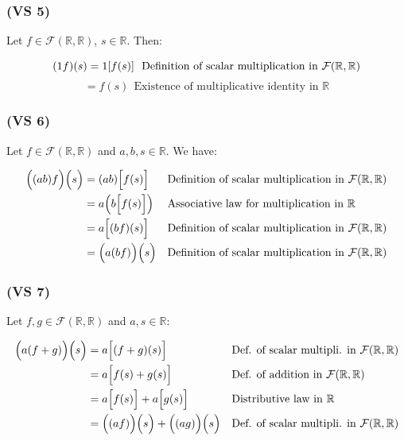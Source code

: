 \documentclass{article}
\begin{document}
\subsubsection*{(VS 5)}

Let \(f\in \mathcal{F}(\mathbb{R}, \mathbb{R})\), \( s \in \mathbb{R}\). Then:

\begin{equation*}
    (1f)(s) = 1[f(s)] \ \ \text{\text{Definition of scalar multiplication in \(\mathcal{F}(\mathbb{R}, \mathbb{R})\)}}
\end{equation*}
\begin{equation*}
    = f(s) \ \ \text{Existence of multiplicative identity in \(\mathbb{R}\)}
\end{equation*}

\subsubsection*{(VS 6)}

Let \(f\in \mathcal{F}(\mathbb{R}, \mathbb{R})\) and \( a, b, s \in \mathbb{R}\). We have:

\begin{align*}
    \Big((ab)f\Big)\Big(s\Big) &= (ab)\Big[f(s)\Big] && \text{\text{Definition of scalar multiplication in \(\mathcal{F}(\mathbb{R}, \mathbb{R})\)}}\\
    &= a\Big(b\Big[f(s)\Big]\Big) && \text{Associative law for multiplication in \(\mathbb{R}\)} \\
    &= a\Big[(bf)(s)\Big] && \text{\text{Definition of scalar multiplication in \(\mathcal{F}(\mathbb{R}, \mathbb{R})\)}} \\
    &= \Big(a(bf)\Big)\Big(s\Big) &&  \text{\text{Definition of scalar multiplication in \(\mathcal{F}(\mathbb{R}, \mathbb{R})\)}} 
\end{align*}

\subsubsection*{(VS 7)}

Let \(f, g \in \mathcal{F}(\mathbb{R}, \mathbb{R})\) and \( a, s \in \mathbb{R}\):

\begin{align*}
    \Big(a(f+g)\Big)\Big(s\Big) &= a\Big[(f+g)(s)\Big] && \text{\text{Def. of scalar multipli. in \(\mathcal{F}(\mathbb{R}, \mathbb{R})\)}}\\
    &= a\Big[f(s) + g(s)\Big]  && \text{Def. of addition in \(\mathcal{F}(\mathbb{R}, \mathbb{R})\)} \\
    &= a\Big[f(s)\Big] + a\Big[g(s)\Big] && \text{Distributive law in \(\mathbb{R}\)} \\ 
    &= \Big((af)\Big)\Big(s\Big) + \Big((ag)\Big)\Big(s\Big) && \text{\text{Def. of scalar multipli. in \(\mathcal{F}(\mathbb{R}, \mathbb{R})\)}}
\end{align*}
\end{document}
